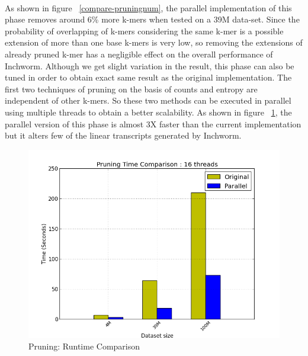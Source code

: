 \label{key}\documentclass[bachinf, english ,zihtitle,final,hyperref,utf8]{zihpub}
\begin{document}
\paragraph{}
As shown in figure ~\ref{compare-pruningnum}, the parallel implementation of this phase removes around 6\% more k-mers when tested on a 39M data-set. Since the probability of overlapping of k-mers considering the same k-mer is a possible extension of more than one base k-mers is very low, so removing the extensions of already pruned k-mer has a negligible effect on the overall performance of Inchworm. Although we get slight variation in the result, this phase can also be tuned in order to obtain exact same result as the original implementation. The first two techniques of pruning on the basis of counts and entropy are independent of other k-mers. So these two methods can be executed in parallel using multiple threads to obtain a better scalability. As shown in figure ~\ref{compare-pruning}, the parallel version of this phase is almost 3X faster than the current implementation but it alters few of the linear transcripts generated by Inchworm.
\begin{figure}[h]
\center
\includegraphics[scale=0.5]{compare-pruning}
\caption{Pruning: Runtime Comparison}
\label{compare-pruning}
\end{figure}
\end{document}
